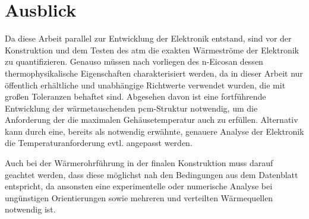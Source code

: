 \chapter{Ausblick}
\label{chap:Ausblick}
\pagestyle{OnlySection}		%

Da diese Arbeit parallel zur Entwicklung der Elektronik entstand, sind vor der Konstruktion und dem Testen des \ac{atm} die exakten
Wärmeströme der Elektronik zu quantifizieren. Genauso müssen nach vorliegen des n-Eicosan dessen thermophysikalische Eigenschaften charakterisiert werden,
da in dieser Arbeit nur öffentlich erhältliche und unabhängige Richtwerte verwendet wurden, die mit großen Toleranzen behaftet sind.
Abgesehen davon ist eine fortführende Entwicklung der wärmetauschenden \ac{pcm}-Struktur notwendig, um die Anforderung der die maximalen
Gehäusetemperatur auch zu erfüllen. Alternativ kann durch eine, bereits als notwendig erwähnte, genauere Analyse der Elektronik
die Temperaturanforderung evtl. angepasst werden.

Auch bei der Wärmerohrführung in der finalen Konstruktion muss darauf geachtet werden, dass diese möglichst nah den Bedingungen aus
dem Datenblatt entspricht, da ansonsten eine experimentelle oder numerische Analyse bei ungünstigen Orientierungen sowie mehreren und verteilten Wärmequellen
notwendig ist.
